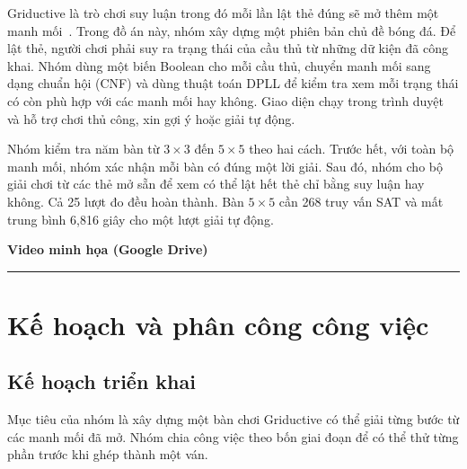 \documentclass[11pt,a4paper]{article}
\begin{document}
Griductive là trò chơi suy luận trong đó mỗi lần lật thẻ đúng sẽ
mở thêm một manh mối~\cite{original}. Trong đồ án này, nhóm xây dựng
một phiên bản chủ đề bóng đá. Để lật thẻ, người chơi phải suy ra
trạng thái của cầu thủ từ những dữ kiện đã công khai. Nhóm dùng
một biến Boolean cho mỗi cầu thủ, chuyển manh mối sang dạng chuẩn
hội (CNF) và dùng thuật toán DPLL để kiểm tra xem mỗi trạng thái
có còn phù hợp với các manh mối hay không. Giao diện chạy trong
trình duyệt và hỗ trợ chơi thủ công, xin gợi ý hoặc giải tự động.

Nhóm kiểm tra năm bàn từ $3\times3$ đến $5\times5$ theo hai cách.
Trước hết, với toàn bộ manh mối, nhóm xác nhận mỗi bàn có đúng một
lời giải. Sau đó, nhóm cho bộ giải chơi từ các thẻ mở sẵn để xem
có thể lật hết thẻ chỉ bằng suy luận hay không. Cả 25 lượt đo
đều hoàn thành. Bàn $5\times5$ cần 268 truy vấn
SAT và mất trung bình 6,816 giây cho một lượt giải tự động.

\medskip

\textbf{Video minh họa (Google Drive)}
\enspace\rule[-0.35ex]{90mm}{0.35pt}\par

\tableofcontents
\clearpage

\section{Kế hoạch và phân công công việc}


\subsection{Kế hoạch triển khai}

Mục tiêu của nhóm là xây dựng một bàn chơi Griductive có thể
giải từng bước từ các manh mối đã mở. Nhóm chia công việc theo
bốn giai đoạn để có thể thử từng phần trước khi ghép thành một ván.
\end{document}
